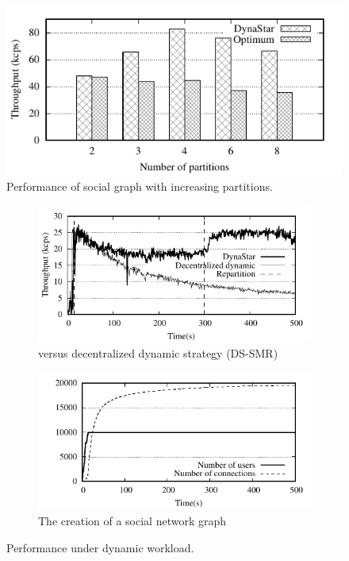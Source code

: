 \begin{figure}[ht]
	\includegraphics[width=0.95\columnwidth]{figures/socc/socc-throughput-avg-vary-partition}
	\caption{Performance of social graph with increasing partitions.}
	\label{fig:4p1p_varying_partition_size}
\end{figure}

\begin{figure}[h!]
  \centering
  \begin{subfigure}[b]{0.45\textwidth}
    \centering
    \includegraphics[width=0.95\columnwidth]{figures/experiments/dynamicload-tp-move-4p}
    \caption{\dynastar versus decentralized dynamic strategy (DS-SMR)}
  \end{subfigure}
  \begin{subfigure}[b]{0.45\textwidth}
    \centering
    \includegraphics[width=0.95\columnwidth]{figures/experiments/dynamicload-graph-structure}
    \caption{The creation of a social network graph}
  \end{subfigure}
    \caption{Performance under dynamic workload.}
	\label{fig:dynamic_load_tput}
\end{figure}

